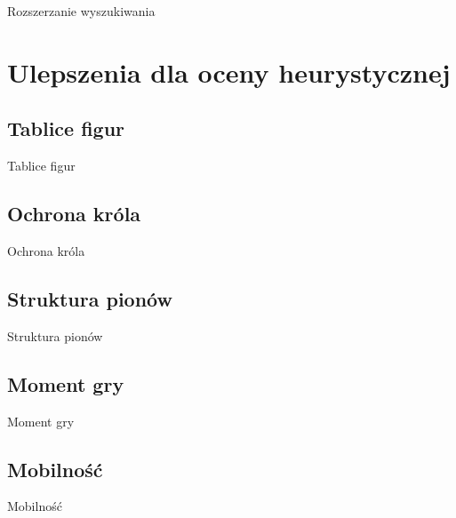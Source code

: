 Rozszerzanie wyszukiwania


\section{Ulepszenia dla oceny heurystycznej}
\label{sec:ulepszenia-dla-oceny-heurystycznej}

\subsection{Tablice figur}
\label{subsec:tablice-figur}

Tablice figur

\subsection{Ochrona króla}
\label{subsec:ochrona-krola}

Ochrona króla

\subsection{Struktura pionów}
\label{subsec:struktura-pionow}

Struktura pionów

\subsection{Moment gry}
\label{subsec:moment-gry}

Moment gry

\subsection{Mobilność}
\label{subsec:mobilnosc}

Mobilność
